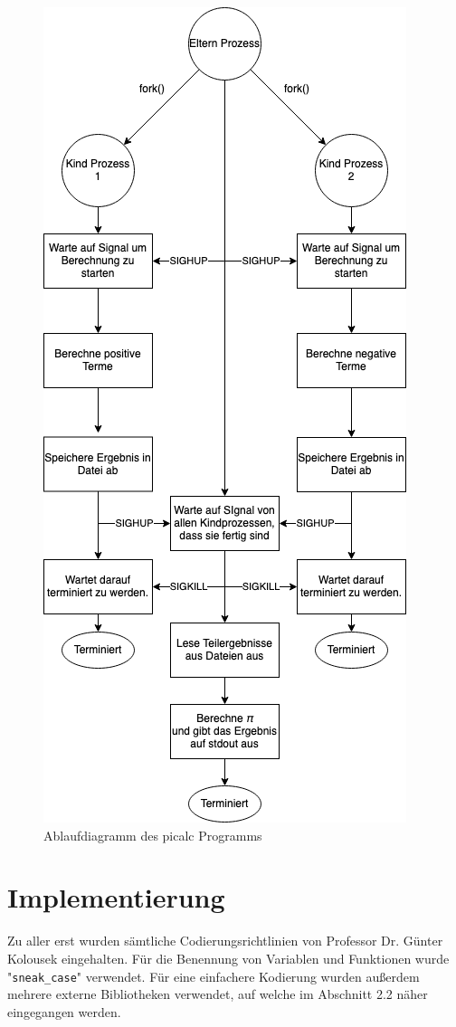 \documentclass[12pt]{article}
\begin{document}
\begin{figure}[htbp]
    \centering
    \includegraphics[scale=0.57]{execution_diagram}
    \caption{Ablaufdiagramm des picalc Programms}
    \label{fig:situation1}
\end{figure}
\FloatBarrier
\newpage
\section{Implementierung}
Zu aller erst wurden sämtliche Codierungsrichtlinien von Professor Dr. Günter 
Kolousek eingehalten. Für die Benennung von Variablen und Funktionen wurde 
"\texttt{sneak\_case}" verwendet. Für eine einfachere Kodierung wurden außerdem 
mehrere externe Bibliotheken verwendet, auf welche im Abschnitt 2.2 näher 
eingegangen werden.
\end{document}
